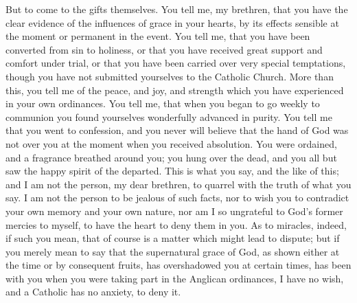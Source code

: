 But to come to the gifts themselves. You tell me, my brethren, that
you have the clear evidence of the influences of grace in your hearts,
by its effects sensible at the moment or permanent in the event. You
tell me, that you have been converted from sin to holiness, or that
you have received great support and comfort under trial, or that you
have been carried over very special temptations, though you have not
submitted yourselves to the Catholic Church. More than this, you tell
me of the peace, and joy, and strength which you have experienced in
your own ordinances. You tell me, that when you began to go weekly to
communion you found yourselves wonderfully advanced in purity. You
tell me that you went to confession, and you never will believe that
the hand of God was not over you at the moment when you received
absolution. You were ordained, and a fragrance breathed around you;
you hung over the dead, and you all but saw the happy spirit of the
departed. This is what you say, and the like of this; and I am not the
person, my dear brethren, to quarrel with the truth of what you say. I
am not the person to be jealous of such facts, nor to wish you to
contradict your own memory and your own nature, nor am I so ungrateful
to God's former mercies to myself, to have the heart to deny them in
you. As to miracles, indeed, if such you mean, that of course is a
matter which might lead to dispute; but if you merely mean to say that
the supernatural grace of God, as shown either at the time or by
consequent fruits, has overshadowed you at certain times, has been
with you when you were taking part in the Anglican ordinances, I have
no wish, and a Catholic has no anxiety, to deny it.


